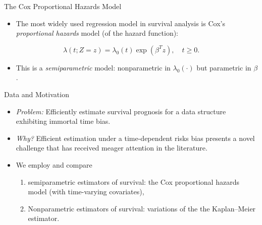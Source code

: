 \documentclass[12pt,t,handout]{beamer}
\begin{document}
\begin{frame}[c]{The Cox Proportional Hazards Model}

\begin{center}
\begin{itemize}
  \item The most widely used regression model in survival analysis is Cox's
    \textit{proportional hazards} model (of the hazard function):
\end{itemize}

$$
\lambda \left(t; Z = z \right) = \lambda_0(t) \exp\left(\beta^Tz \right),
\quad t\geq 0.
$$

\begin{itemize}
  \item This is a \textit{semiparametric} model: nonparametric in
    $\lambda_0(\cdot)$ but parametric in $\beta$.
\end{itemize}
\end{center}


\end{frame}


\begin{frame}[c]{Data and Motivation}

\begin{center}
\begin{itemize}
  \itemsep12pt
  \item \textit{Problem:} Efficiently estimate survival prognosis for a data
    structure exhibiting immortal time bias.
  \item \textit{Why?} Efficient estimation under a time-dependent risks bias
    presents a novel challenge that has received meager attention in the
    literature.
  \item We employ and compare
    \begin{enumerate}
      \item semiparametric estimators of survival: the Cox proportional hazards
        model (with time-varying covariates),
      \item Nonparametric estimators of survival: variations of the the
        Kaplan--Meier estimator.
    \end{enumerate}
\end{itemize}
\end{center}


\end{frame}
\end{document}
